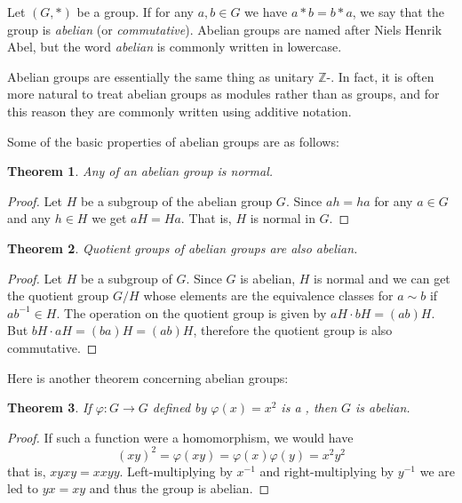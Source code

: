 \documentclass[12pt]{article}
\newtheorem{thm}{Theorem}
\def\Z{\mathbb{Z}}
\begin{document}

Let $(G,*)$ be a group. If for any $a,b\in G$ we have
$a*b=b*a$, we say that the group is \emph{abelian} (or \emph{commutative}).
Abelian groups are named after Niels Henrik Abel, but the word {\it abelian} is commonly written in lowercase.

Abelian groups are essentially the same thing as unitary $\Z$-.
In fact, it is often more natural to treat abelian groups as modules rather than as groups, and for this reason they are commonly written using additive notation. 

Some of the basic properties of abelian groups are as follows:

\begin{thm}
Any  of an abelian group is normal.
\end{thm}
\begin{proof}
Let $H$ be a subgroup of the abelian group $G$. Since $ah=ha$ for any $a\in G$ and any $h\in H$ we get $aH=Ha$. That is, $H$ is normal in $G$.
\end{proof}

\begin{thm}
Quotient groups of abelian groups are also abelian.
\end{thm}
\begin{proof}
Let $H$ be a subgroup of $G$. Since $G$ is abelian, $H$ is normal and we can get the quotient group $G/H$ whose elements are the equivalence classes for 
$a\sim b$ if $ab^{-1}\in H$.
The operation on the quotient group is given by $aH\cdot bH=(ab)H$. But $bH\cdot aH=(ba)H =(ab)H$, therefore the quotient group is also commutative.
\end{proof}

Here is another theorem concerning abelian groups:

\begin{thm} 
If $\varphi\colon G\to G$ defined by $ \varphi(x) =x^2$ is a , then $G$ is abelian.
\end{thm}
\begin{proof}
If such a function were a homomorphism,
we would have
\[(xy)^2=\varphi(xy) = \varphi(x)\varphi(y)=x^2y^2\] that is, $xyxy=xxyy$.
Left-multiplying by $x^{-1}$ and right-multiplying by $y^{-1}$ we are led to
$yx=xy$ and thus the group is abelian.
\end{proof}

\end{document}
